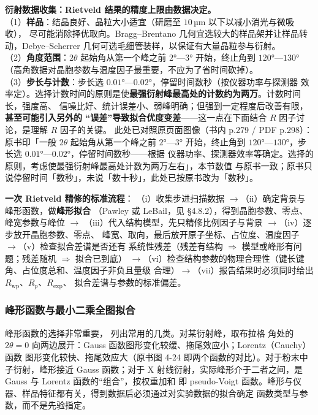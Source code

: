 \begin{measure}
\textbf{衍射数据收集：Rietveld 结果的精度上限由数据决定。}\\
（1）\textbf{样品}：结晶良好、晶粒大小适宜（研磨至 $10$\,µm 以下以减小消光与微吸收），
尽可能消除择优取向。Bragg--Brentano 几何宜选较大的样品架并让样品转动，Debye--Scherrer
几何可选毛细管装样，以保证有大量晶粒参与衍射。\\
（2）\textbf{角度范围}：$2\theta$ 起始角从第一个峰之前 $2°$—$3°$ 开始，终止角到
$120°$—$130°$（高角数据对晶胞参数与温度因子最重要，不应为了省时间砍掉）。\\
（3）\textbf{步长与计数}：步长选 $0.01°$—$0.02°$，停留时间数秒（按仪器功率与探测器
效率定）。选择计数时间的原则是使\textbf{最强衍射峰最高处的计数约为两万}。计数时间长，强度高、
信噪比好、统计误差小、弱峰明确；但强到一定程度后改善有限，\textbf{甚至可能引入另外的
``误差''导致拟合优度变差}——这一点在下面结合 $R$ 因子讨论，是理解 $R$ 因子的关键。
此处已对照原页面图像（书内 p.279 / PDF p.298）：原书印「一般 $2\theta$ 起始角从第一个峰之前
$2°$—$3°$ 开始，终止角到 $120°$—$130°$，步长选 $0.01°$—$0.02°$，停留时间数秒——根据
仪器功率、探测器效率等确定。选择的原则，考虑使最强衍射峰最高处计数为两万左右」，本节数值
与原书一致；原书只说停留时间「数秒」，未说「数十秒」，此处已按原书改为「数秒」。
\end{measure}

\begin{dataflow}
\textbf{一次 Rietveld 精修的标准流程}：
（i）收集步进扫描数据 $\rightarrow$（ii）确定背景与峰形函数，做\textbf{峰形拟合}
（Pawley 或 LeBail，见 §4.8.2），得到晶胞参数、零点、峰宽参数与峰位 $\rightarrow$
（iii）代入结构模型，先只精修比例因子与背景 $\rightarrow$（iv）逐步放开晶胞参数、零点、
峰宽、取向，最后放开原子坐标、占位度、温度因子 $\rightarrow$（v）检查拟合差谱是否还有
系统性残差（残差有结构 $\Rightarrow$ 模型或峰形有问题；残差随机 $\Rightarrow$ 拟合已到底）
$\rightarrow$（vi）检查结构参数的物理合理性（键长键角、占位度总和、温度因子非负且量级
合理）$\rightarrow$（vii）报告结果时必须同时给出 $R_{\mathrm{wp}}$、$R_{p}$、$R_{\mathrm{exp}}$、
拟合差谱与参数的标准偏差。
\end{dataflow}

\subsubsection{峰形函数与最小二乘全图拟合}

\begin{principle}
峰形函数的选择非常重要， 列出常用的几类。对某衍射峰，取布拉格
角处的 $2\theta=0$ 向两边展开：Gauss 函数图形变化较缓、拖尾效应小；Lorentz（Cauchy）函数
图形变化较快、拖尾效应大（原书图 4-24 即两个函数的对比）。对于粉末中子衍射，峰形接近 Gauss
函数；对于 X 射线衍射，实际峰形介于二者之间，是 Gauss 与 Lorentz 函数的``组合''，按权重加和
即 pseudo-Voigt 函数。峰形与仪器、样品特征都有关，得到数据后必须通过对实验数据的拟合确定
函数类型与参数，而不是先验指定。
\end{principle}

